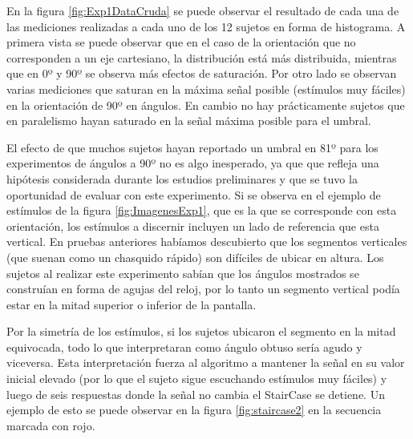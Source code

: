 \documentclass{article}
\numberwithin{figure}{section}
\begin{document}
    En la figura \ref{fig:Exp1DataCruda} se puede observar el resultado de cada una de las mediciones realizadas a cada uno de los 12 sujetos en forma de histograma. A primera vista se puede observar que en el caso de la orientación que no corresponden a un eje cartesiano, la distribución está más distribuida, mientras que en 0º y 90º se observa más efectos de saturación. Por otro lado se observan varias mediciones que saturan en la máxima señal posible (estímulos muy fáciles) en la orientación de 90º en ángulos. En cambio no hay prácticamente sujetos que en paralelismo hayan saturado en la señal máxima posible para el umbral. 
    
    El efecto de que muchos sujetos hayan reportado un umbral en 81º para los experimentos de ángulos a 90º no es algo inesperado, ya que que refleja una hipótesis considerada durante los estudios preliminares y que se tuvo la oportunidad de evaluar con este experimento. Si se observa en el ejemplo de estímulos de la figura \ref{fig:ImagenesExp1}, que es la que se corresponde con esta orientación, los estímulos a discernir incluyen un lado de referencia que esta vertical. En pruebas anteriores habíamos descubierto que los segmentos verticales (que suenan como un chasquido rápido) son difíciles de ubicar en altura. Los sujetos al realizar este experimento sabían que los ángulos mostrados se construían en forma de agujas del reloj, por lo tanto un segmento vertical podía estar en la mitad superior o inferior de la pantalla. 
    
    Por la simetría de los estímulos, si los sujetos ubicaron el segmento en la mitad equivocada, todo lo que interpretaran como ángulo obtuso sería agudo y viceversa. Esta interpretación fuerza al algoritmo a mantener la señal en su valor inicial elevado (por lo que el sujeto sigue escuchando estímulos muy fáciles) y luego de seis respuestas donde la señal no cambia el StairCase se detiene. Un ejemplo de esto se puede observar en la figura \ref{fig:staircase2} en la secuencia marcada con rojo. 
    
\end{document}
